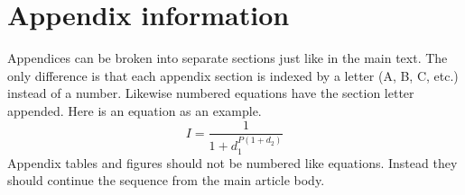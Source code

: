 \documentclass[linenumbers,amsmath,trackchanges]{aastex702}
\begin{document}
%



\appendix

\section{Appendix information}

Appendices can be broken into separate sections just like in the main text.
The only difference is that each appendix section is indexed by a letter
(A, B, C, etc.) instead of a number.  Likewise numbered equations have
the section letter appended.  Here is an equation as an example.
\begin{equation}
I = \frac{1}{1 + d_{1}^{P (1 + d_{2} )}}
\end{equation}
Appendix tables and figures should not be numbered like equations. Instead
they should continue the sequence from the main article body.
\end{document}
